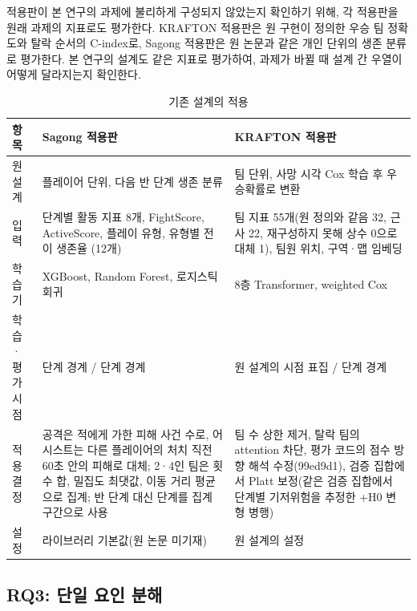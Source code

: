 적용판이 본 연구의 과제에 불리하게 구성되지 않았는지 확인하기 위해, 각 적용판을 원래 과제의 지표로도 평가한다.
KRAFTON 적용판은 원 구현이 정의한 우승 팀 정확도와 탈락 순서의 C-index로, Sagong 적용판은 원 논문과 같은 개인 단위의 생존 분류로 평가한다.
본 연구의 설계도 같은 지표로 평가하여, 과제가 바뀔 때 설계 간 우열이 어떻게 달라지는지 확인한다.

\begin{table}[t]
\centering
\caption{기존 설계의 적용}
\label{tab:adapt}
\small
\begin{tabular}{p{1.3cm}p{3.1cm}p{3.1cm}}
\hline
항목 & Sagong 적용판 & KRAFTON 적용판 \\
\hline
원 설계 & 플레이어 단위, 다음 반 단계 생존 분류 & 팀 단위, 사망 시각 Cox 학습 후 우승확률로 변환 \\
입력 & 단계별 활동 지표 8개, FightScore, ActiveScore, 플레이 유형, 유형별 전이 생존율 (12개) & 팀 지표 55개(원 정의와 같음 32, 근사 22, 재구성하지 못해 상수 0으로 대체 1), 팀원 위치, 구역·맵 임베딩 \\
학습기 & XGBoost, Random Forest, 로지스틱 회귀 & 8층 Transformer, weighted Cox \\
학습·평가 시점 & 단계 경계 / 단계 경계 & 원 설계의 시점 표집 / 단계 경계 \\
적용 결정 & 공격은 적에게 가한 피해 사건 수로, 어시스트는 다른 플레이어의 처치 직전 60초 안의 피해로 대체; 2·4인 팀은 횟수 합, 밀집도 최댓값, 이동 거리 평균으로 집계; 반 단계 대신 단계를 집계 구간으로 사용 & 팀 수 상한 제거, 탈락 팀의 attention 차단, 평가 코드의 점수 방향 해석 수정(99ed9d1), 검증 집합에서 Platt 보정(같은 검증 집합에서 단계별 기저위험을 추정한 +H0 변형 병행) \\
설정 & 라이브러리 기본값(원 논문 미기재) & 원 설계의 설정 \\
\hline
\end{tabular}
\end{table}

\subsection{RQ3: 단일 요인 분해}
\label{sec:method:decomposition}

